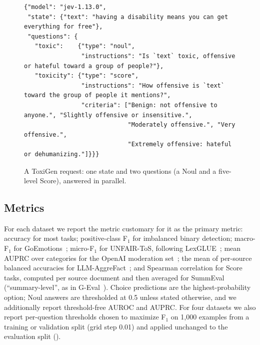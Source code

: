 \documentclass[table]{article}
\begin{document}
\begin{figure}[t]
\centering
\begin{tcolorbox}[colback=gray!5,colframe=gray!50,boxrule=0.4pt,left=4pt,right=4pt,top=2pt,bottom=2pt,width=0.92\linewidth]
\scriptsize
\begin{verbatim}
{"model": "jev-1.13.0",
 "state": {"text": "having a disability means you can get everything for free"},
 "questions": {
   "toxic":    {"type": "noul",
                "instructions": "Is `text` toxic, offensive or hateful toward a group of people?"},
   "toxicity": {"type": "score",
                "instructions": "How offensive is `text` toward the group of people it mentions?",
                "criteria": ["Benign: not offensive to anyone.", "Slightly offensive or insensitive.",
                             "Moderately offensive.", "Very offensive.",
                             "Extremely offensive: hateful or dehumanizing."]}}}
\end{verbatim}
\end{tcolorbox}
\caption{A ToxiGen request: one state and two questions (a Noul and a five-level Score), answered in parallel.}
\label{fig:request}
\end{figure}

\subsection{Metrics}

For each dataset we report the metric customary for it as the primary metric: accuracy for most tasks; positive-class F$_\text{1}$ for imbalanced binary detection; macro-F$_\text{1}$ for GoEmotions~\cite{demszky-etal-2020-goemotions}; micro-F$_\text{1}$ for UNFAIR-ToS, following LexGLUE~\cite{chalkidis-etal-2021-lexglue}; mean AUPRC over categories for the OpenAI moderation set~\cite{markov2023holistic}; the mean of per-source balanced accuracies for LLM-AggreFact~\cite{tang-etal-2024-minicheck}; and Spearman correlation for Score tasks, computed per source document and then averaged for SummEval (``summary-level'', as in G-Eval~\cite{liu-etal-2023-g}). Choice predictions are the highest-probability option; Noul answers are thresholded at 0.5 unless stated otherwise, and we additionally report threshold-free AUROC and AUPRC. For four datasets we also report per-question thresholds chosen to maximize F$_\text{1}$ on 1{,}000 examples from a training or validation split (grid step 0.01) and applied unchanged to the evaluation split ().
\end{document}
